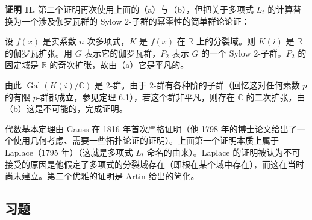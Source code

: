 \noindent\textbf{证明 II.} 第二个证明再次使用上面的（a）与（b），但把关于多项式 \(L_t\) 的计算替换为一个涉及伽罗瓦群的 Sylow 2-子群的幂零性的简单群论论证：

设 \(f(x)\) 是实系数 \(n\) 次多项式，\(K\) 是 \(f(x)\) 在 \(\mathbb{R}\) 上的分裂域。则 \(K(i)\) 是 \(\mathbb{R}\) 的伽罗瓦扩张。用 \(G\) 表示它的伽罗瓦群，\(P_2\) 表示 \(G\) 的一个 Sylow 2-子群。\(P_2\) 的固定域是 \(\mathbb{R}\) 的奇次扩张，故由（a）它是平凡的。

由此 \(\operatorname{Gal}(K(i)/\mathbb{C})\) 是 2-群。由于 2-群有各种阶的子群（回忆这对任何素数 \(p\) 的有限 \(p\)-群都成立，参见定理 6.1），若这个群非平凡，则存在 \(\mathbb{C}\) 的二次扩张，由（b）这是不可能的，完成证明。

代数基本定理由 Gauss 在 1816 年首次严格证明（他 1798 年的博士论文给出了一个使用几何考虑、需要一些拓扑论证的证明）。上面第一个证明本质上属于 Laplace（1795 年）（这就是多项式 \(L_t\) 命名的由来）。Laplace 的证明被认为不可接受的原因是他假定了多项式的分裂域存在（即根在某个域中存在），而这在当时尚未建立。第二个优雅的证明是 Artin 给出的简化。

\subsection*{习题}

